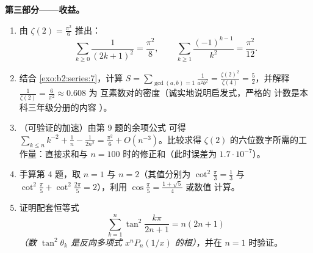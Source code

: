\begin{problem}[{周末问题——$\zeta(2) = \pi^2/6$ 与
伯特兰全景}]
\medskip
\noindent\textbf{第三部分——收益。}
\begin{enumerate}[resume]
  \item 由 $\zeta(2) = \frac{\pi^2}6$ 推出：
        \[
        \sum_{k\geq0}\frac{1}{(2k+1)^2} = \frac{\pi^2}{8},
        \qquad
        \sum_{k\geq1}\frac{(-1)^{k-1}}{k^2} = \frac{\pi^2}{12}.
        \]
  \item 结合 \cref{exo:b2:series:7}，计算 $S =
        \sum_{\gcd(a,b)=1}\frac{1}{a^2b^2} =
        \frac{\zeta(2)^2}{\zeta(4)} = \frac52$，并解释
        $\frac{1}{\zeta(2)} = \frac{6}{\pi^2} \approx 0.608$ 为
        互素数对的密度（诚实地说明启发式，严格的
        计数是本科三年级分册的内容
        ）。
  \item （可验证的加速）由第 9 题的余项公式
        可得 $\sum_{k\leq n}k^{-2} + \frac1n - \frac1{2n^2} =
        \frac{\pi^2}6 + O(n^{-3})$。比较求得
        $\zeta(2)$ 的六位数字所需的工作量：直接求和与
        $n = 100$ 时的修正和（此时误差为
        $1.7\cdot10^{-7}$）。
  \item 手算第 4 题，取 $n = 1$ 与 $n = 2$（其值分别为
        $\cot^2\frac\pi3 = \frac13$ 与
        $\cot^2\frac\pi5 + \cot^2\frac{2\pi}5 = 2$），利用
        $\cos\frac\pi5 = \frac{1+\sqrt5}4$ 或数值
        计算。
  \item 证明配套恒等式
        \[
        \sum_{k=1}^{n}\tan^2\frac{k\pi}{2n+1} = n(2n+1)
        \]
        \emph{（数 $\tan^2\theta_k$ 是反向多项式
        $x^nP_n(1/x)$ 的根）}，并在 $n
        = 1$ 时验证。
\end{enumerate}


\end{problem}
